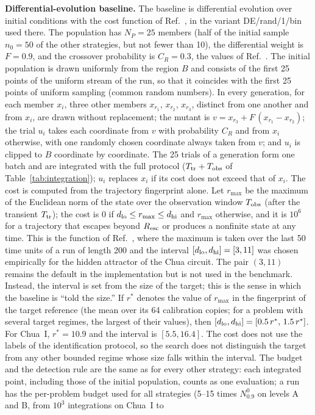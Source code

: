 
\textbf{Differential-evolution baseline.} The baseline is differential evolution over initial conditions with the cost function of Ref.~\cite{Zelinka2016}, in the variant DE/rand/1/bin used there. The population has $N_P=25$ members (half of the initial sample $n_0=50$ of the other strategies, but not fewer than 10), the differential weight is $F=0.9$, and the crossover probability is $C_R=0.3$, the values of Ref.~\cite{Zelinka2016}. The initial population is drawn uniformly from the region $B$ and consists of the first 25 points of the uniform stream of the run, so that it coincides with the first 25 points of uniform sampling (common random numbers). In every generation, for each member $x_i$, three other members $x_{r_1}$, $x_{r_2}$, $x_{r_3}$, distinct from one another and from $x_i$, are drawn without replacement; the mutant is $v=x_{r_3}+F\,(x_{r_1}-x_{r_2})$; the trial $u_i$ takes each coordinate from $v$ with probability $C_R$ and from $x_i$ otherwise, with one randomly chosen coordinate always taken from $v$; and $u_i$ is clipped to $B$ coordinate by coordinate. The 25 trials of a generation form one batch and are integrated with the full protocol ($T_{\rm tr}+T_{\rm obs}$ of Table~\ref{tab:integration}); $u_i$ replaces $x_i$ if its cost does not exceed that of $x_i$. The cost is computed from the trajectory fingerprint alone. Let $r_{\max}$ be the maximum of the Euclidean norm of the state over the observation window $T_{\rm obs}$ (after the transient $T_{\rm tr}$); the cost is 0 if $d_{\rm lo}\le r_{\max}\le d_{\rm hi}$ and $r_{\max}$ otherwise, and it is $10^6$ for a trajectory that escapes beyond $R_{\rm esc}$ or produces a nonfinite state at any time. This is the function of Ref.~\cite{Zelinka2016}, where the maximum is taken over the last 50 time units of a run of length 200 and the interval $[d_{\rm lo},d_{\rm hi}]=[3,11]$ was chosen empirically for the hidden attractor of the Chua circuit. The pair $(3,11)$ remains the default in the implementation but is not used in the benchmark. Instead, the interval is set from the size of the target; this is the sense in which the baseline is ``told the size.'' If $r^\ast$ denotes the value of $r_{\max}$ in the fingerprint of the target reference (the mean over its 64 calibration copies; for a problem with several target regimes, the largest of their values), then $[d_{\rm lo},d_{\rm hi}]=[0.5\,r^\ast,\,1.5\,r^\ast]$. For Chua~I, $r^\ast=10.9$ and the interval is $[5.5,16.4]$. The cost does not use the labels of the identification protocol, so the search does not distinguish the target from any other bounded regime whose size falls within the interval. The budget and the detection rule are the same as for every other strategy: each integrated point, including those of the initial population, counts as one evaluation; a run has the per-problem budget used for all strategies (5--15 times $N^0_{0.9}$ on levels A and B, from $10^3$ integrations on Chua~I to 